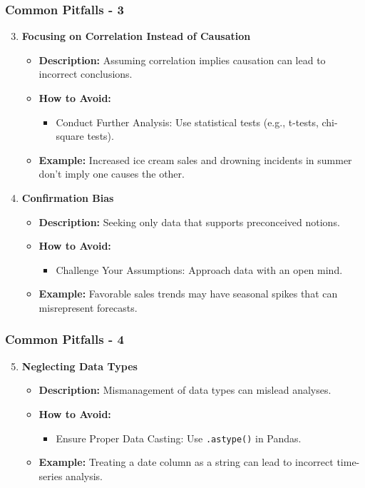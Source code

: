\documentclass[aspectratio=169]{beamer}
\begin{document}
\begin{frame}
    \frametitle{Common Pitfalls - 3}
    \begin{enumerate}
        \setcounter{enumi}{2} %
        \item \textbf{Focusing on Correlation Instead of Causation}
        \begin{itemize}
            \item \textbf{Description:} Assuming correlation implies causation can lead to incorrect conclusions.
            \item \textbf{How to Avoid:}
            \begin{itemize}
                \item Conduct Further Analysis: Use statistical tests (e.g., t-tests, chi-square tests).
            \end{itemize}
            \item \textbf{Example:} Increased ice cream sales and drowning incidents in summer don't imply one causes the other.
        \end{itemize}
        
        \item \textbf{Confirmation Bias}
        \begin{itemize}
            \item \textbf{Description:} Seeking only data that supports preconceived notions.
            \item \textbf{How to Avoid:}
            \begin{itemize}
                \item Challenge Your Assumptions: Approach data with an open mind.
            \end{itemize}
            \item \textbf{Example:} Favorable sales trends may have seasonal spikes that can misrepresent forecasts.
        \end{itemize}
    \end{enumerate}
\end{frame}

\begin{frame}
    \frametitle{Common Pitfalls - 4}
    \begin{enumerate}
        \setcounter{enumi}{4} %
        \item \textbf{Neglecting Data Types}
        \begin{itemize}
            \item \textbf{Description:} Mismanagement of data types can mislead analyses.
            \item \textbf{How to Avoid:}
            \begin{itemize}
                \item Ensure Proper Data Casting: Use \texttt{.astype()} in Pandas.
            \end{itemize}
            \item \textbf{Example:} Treating a date column as a string can lead to incorrect time-series analysis.
        \end{itemize}
    \end{enumerate}
\end{frame}
\end{document}
